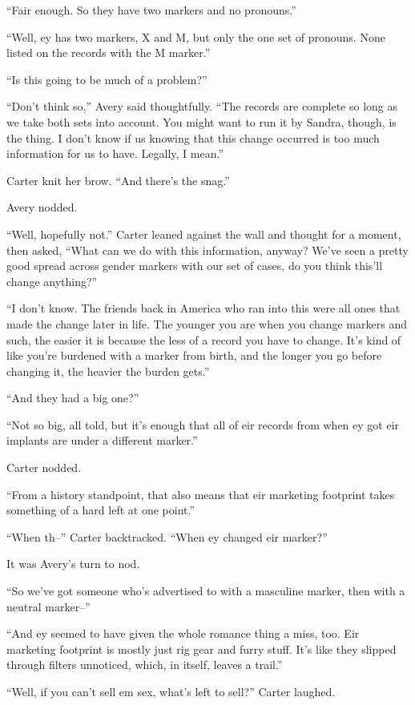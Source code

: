 ``Fair enough. So they have two markers and no pronouns.''

``Well, ey has two markers, X and M, but only the one set of pronouns. None listed on the records with the M marker.''

``Is this going to be much of a problem?''

``Don't think so,'' Avery said thoughtfully. ``The records are complete so long as we take both sets into account. You might want to run it by Sandra, though, is the thing. I don't know if us knowing that this change occurred is too much information for us to have. Legally, I mean.''

Carter knit her brow. ``And there's the snag.''

Avery nodded.

``Well, hopefully not.'' Carter leaned against the wall and thought for a moment, then asked, ``What can we do with this information, anyway? We've seen a pretty good spread across gender markers with our set of cases, do you think this'll change anything?''

``I don't know. The friends back in America who ran into this were all ones that made the change later in life. The younger you are when you change markers and such, the easier it is because the less of a record you have to change. It's kind of like you're burdened with a marker from birth, and the longer you go before changing it, the heavier the burden gets.''

``And they had a big one?''

``Not so big, all told, but it's enough that all of eir records from when ey got eir implants are under a different marker.''

Carter nodded.

``From a history standpoint, that also means that eir marketing footprint takes something of a hard left at one point.''

``When th--'' Carter backtracked. ``When ey changed eir marker?''

It was Avery's turn to nod.

``So we've got someone who's advertised to with a masculine marker, then with a neutral marker--''

``And ey seemed to have given the whole romance thing a miss, too. Eir marketing footprint is mostly just rig gear and furry stuff. It's like they slipped through filters unnoticed, which, in itself, leaves a trail.''

``Well, if you can't sell em sex, what's left to sell?'' Carter laughed.

